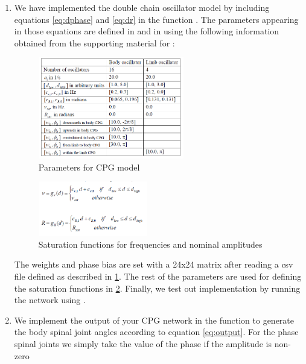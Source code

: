 \documentclass{cmc}
\begin{document}
\begin{enumerate}
\item We have implemented the double chain oscillator model by including equations \ref{eq:dphase} and \ref{eq:dr} in the function . The parameters appearing in those equations are defined in  and in  using the following information obtained from the supporting material for \cite{ijspeert2007swimming}:


\begin{figure}[h!]
    \centering
        \includegraphics[width=0.6\textwidth]{figures/parameters.PNG} 
    \caption{Parameters for CPG model} 
    \label{fig:parameters}                            
\end{figure}

\newpage

\begin{figure}[h!]
    \centering
        \includegraphics[width=0.45\textwidth]{figures/saturation_function.PNG} 
    \caption{Saturation functions for frequencies and nominal amplitudes}
    \label{fig:saturation}                            
\end{figure}

The weights and phase bias are set with a 24x24 matrix after reading a csv file defined as described in \ref{fig:parameters}. The rest of the parameters are used for defining the saturation functions in \ref{fig:saturation}.
Finally, we test out implementation by running the network using .

\item We implement the output of your CPG network in the function
   to generate the body spinal joint
  angles according to equation \ref{eq:output}. For the phase spinal joints we simply take the value of the phase if the amplitude is non-zero


\end{enumerate}
\end{document}
